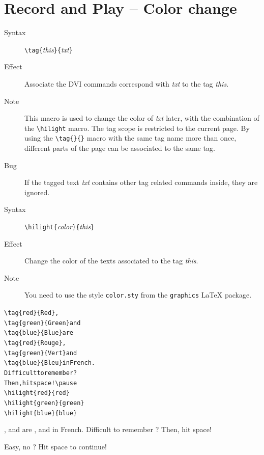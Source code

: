 \documentclass{article}
\begin{document}
\section{Record and Play -- Color change}

\begin{description}
\item[Syntax]  \verb!\tag{!{\em{this}}\verb!}{!{\em{txt}}\verb!}!
\item[Effect] Associate the DVI commands correspond with {\em{txt}} to
  the {\ActiveDVI} tag {\em{this}}.
\item[Note] This macro is used to change the color of {\em{txt}}
  later, with the combination of the \verb!\hilight! macro.
  The tag scope is restricted to the current page.
  By using the \verb!\tag{}{}! macro with the same tag name more than once,
  different parts of the page can be associated to the same tag.
\item[Bug] If the tagged text {\em{txt}} contains other tag related
 commands inside, they are ignored.
\end{description}

\begin{description}
\item[Syntax]  \verb!\hilight{!{\em{color}}\verb!}{!{\em{this}}\verb!}!
\item[Effect] Change the color of the texts associated to the tag {\em{this}}.
\item[Note] You need to use the style \verb!color.sty! from the
\verb"graphics" {\LaTeX} package.
\end{description}

\begin{minipage}[t]{0.5\textwidth}
\begin{alltt}
{\color{blue}\verb!\tag{red}{Red}!}, 
{\color{blue}\verb!\tag{green}{Green}!} and 
{\color{blue}\verb!\tag{blue}{Blue}!} are
{\color{blue}\verb!\tag{red}{Rouge}!}, 
{\color{blue}\verb!\tag{green}{Vert}!} and 
{\color{blue}\verb!\tag{blue}{Bleu}!} in French.
Difficult to remember ?
Then, hit space!\verb!\pause!
{\color{blue}\verb!\hilight{red}{red}!}
{\color{blue}\verb!\hilight{green}{green}!}
{\color{blue}\verb!\hilight{blue}{blue}!}
\end{alltt}
\end{minipage}
\begin{minipage}[t]{0.5\textwidth}
, 
 and 
 are
, 
 and 
 in French.
Difficult to remember ? 
Then, hit space!\pause
{}
\end{minipage}
\noindent
Easy, no ? Hit space to continue!\pause
\end{document}
